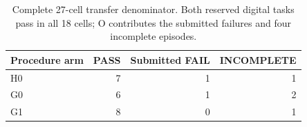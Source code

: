 \begin{table}[htbp]
\centering\small
\caption{Complete 27-cell transfer denominator. Both reserved digital tasks pass in all 18 cells; O contributes the submitted failures and four incomplete episodes.}
\label{tab:finalarms}
\begin{tabular}{@{}lrrr@{}}\toprule
Procedure arm & PASS & Submitted FAIL & INCOMPLETE \\\midrule
H0 & 7 & 1 & 1 \\
G0 & 6 & 1 & 2 \\
G1 & 8 & 0 & 1 \\
\bottomrule\end{tabular}
\end{table}
